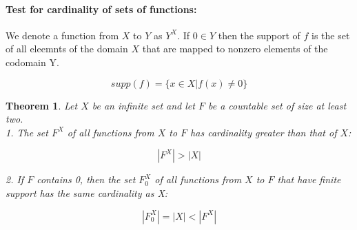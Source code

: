 \documentclass[12pt]{article}
\newtheorem{theorem}{Theorem}
\begin{document}
\paragraph{Test for cardinality of sets of functions:}

We denote a function from $X$ to $Y$ as $Y^{X}$. If $0 \in Y$ then the support of $f$ is the set of all eleemnts of the domain $X$ that are mapped to nonzero elements of the codomain Y.

\[ supp(f) = \{x \in X | f(x) \neq 0\} \]

\begin{theorem}
Let $X$ be an infinite set and let $F$ be a countable set of size at least two.\\
1. The set $F^X$ of all functions from $X$ to $F$ has cardinality greater than that of $X$:

\[|F^X| > |X| \]

2. If $F$ contains 0, then the set $F_{0} ^X$ of all functions from $X$ to $F$ that have finite support has the same cardinality as X:

\[ |F_{0} ^X| = |X| < |F^X| \]

\end{theorem}
\end{document}
